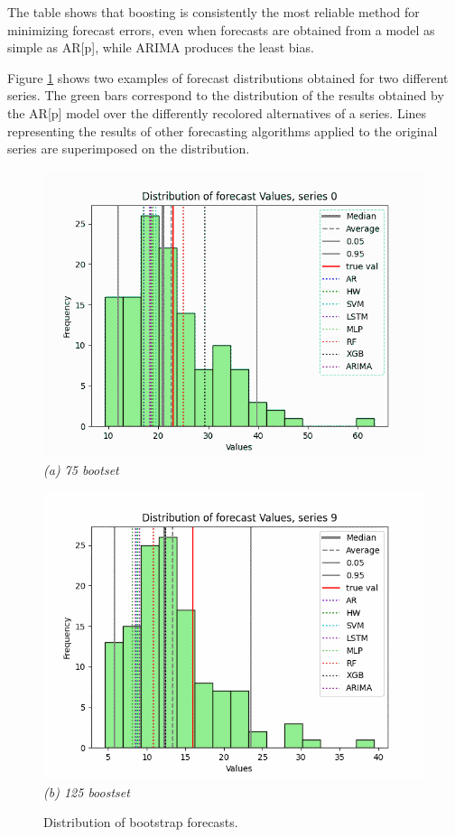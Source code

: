 \documentclass[opre,sglanonrev,11pt]{informs4}
\begin{document}
The table shows that boosting is consistently the most reliable method for minimizing forecast errors, even when forecasts are obtained from a model as simple as AR[p], while ARIMA produces the least bias.

Figure \ref{fig:distr} shows two examples of forecast distributions obtained for two different series. The green bars correspond to the distribution of the results obtained by the AR[p] model over the differently recolored alternatives of a series. Lines representing the results of other forecasting algorithms applied to the original series are superimposed on the distribution.


\begin{figure}[ht]
	\centering
	\begin{minipage}{0.48\textwidth}
		\centering
		\includegraphics[width=\linewidth]{distr_75_0.png}
		\label{fig:dista}%
		\vspace{0.5em}
		\textit{(a) 75 bootset}
	\end{minipage}
	\hfill
	\begin{minipage}{0.48\textwidth}
		\centering
		\includegraphics[width=\linewidth]{distr_75_9.png}
		\label{fig:distb}%
		\vspace{0.5em}
		\textit{(b) 125 boostset}
	\end{minipage}
	\caption{Distribution of bootstrap forecasts.}
	\label{fig:distr}
\end{figure}
\end{document}
